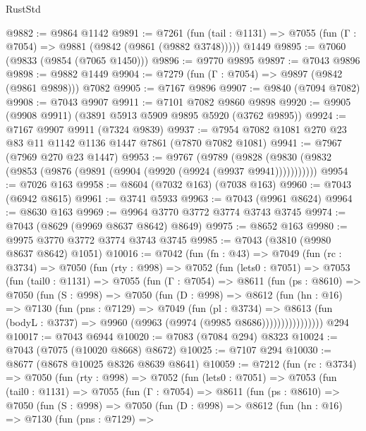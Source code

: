 \begin{lexlean}{RustStd}
\begin{coremodule}
@9882 := @9864 @1142
@9891 := @7261
    (fun (tail : @1131) => @7055 (fun (Γ : @7054) => @9881 (@9842 (@9861 (@9882 @3748)))))
    @1449
@9895 := @7060 (@9833 (@9854 (@7065 @1450)))
@9896 := @9770 @9895
@9897 := @7043 @9896
@9898 := @9882 @1449
@9904 := @7279 (fun (Γ : @7054) => @9897 (@9842 (@9861 @9898))) @7082
@9905 := @7167 @9896
@9907 := @9840 (@7094 @7082)
@9908 := @7043 @9907
@9911 := @7101 @7082 @9860 @9898
@9920 := @9905 (@9908 @9911) (@3891 @5913 @5909 @9895 @5920 (@3762 @9895))
@9924 := @7167 @9907 @9911 (@7324 @9839)
@9937 := @7954 @7082 @1081 @270 @23 @83 @11 @1142 @1136 @1447 @7861 (@7870 @7082 @1081)
@9941 := @7967 (@7969 @270 @23 @1447)
@9953 := @9767
    (@9789 (@9828 (@9830 (@9832 (@9853 (@9876 (@9891 (@9904 (@9920 (@9924 (@9937 @9941)))))))))))
@9954 := @7026 @163
@9958 := @8604 (@7032 @163) (@7038 @163)
@9960 := @7043 (@6942 @8615)
@9961 := @3741 @5933
@9963 := @7043 (@9961 @8624)
@9964 := @8630 @163
@9969 := @9964 @3770 @3772 @3774 @3743 @3745
@9974 := @7043 (@8629 (@9969 @8637 @8642) @8649)
@9975 := @8652 @163
@9980 := @9975 @3770 @3772 @3774 @3743 @3745
@9985 := @7043 (@3810 (@9980 @8637 @8642) @1051)
@10016 := @7042
    (fun (fn : @43) =>
    @7049
      (fun (rc : @3734) =>
      @7050
        (fun (rty : @998) =>
        @7052
          (fun (lets0 : @7051) =>
          @7053
            (fun (tail0 : @1131) =>
            @7055
              (fun (Γ : @7054) =>
              @8611
                (fun (ps : @8610) =>
                @7050
                  (fun (S : @998) =>
                  @7050
                    (fun (D : @998) =>
                    @8612
                      (fun (hn : @16) =>
                      @7130
                        (fun (pns : @7129) =>
                        @7049
                          (fun (pl : @3734) =>
                          @8613
                            (fun (bodyL : @3737) => @9960 (@9963 (@9974 (@9985 @8686))))))))))))))))
    @294
@10017 := @7043 @6944
@10020 := @7083 (@7084 @294) @8323
@10024 := @7043 (@7075 (@10020 @8668) @8672)
@10025 := @7107 @294
@10030 := @8677 (@8678 @10025 @8326 @8639 @8641)
@10059 := @7212
    (fun (rc : @3734) =>
    @7050
      (fun (rty : @998) =>
      @7052
        (fun (lets0 : @7051) =>
        @7053
          (fun (tail0 : @1131) =>
          @7055
            (fun (Γ : @7054) =>
            @8611
              (fun (ps : @8610) =>
              @7050
                (fun (S : @998) =>
                @7050
                  (fun (D : @998) =>
                  @8612
                    (fun (hn : @16) =>
                    @7130
                      (fun (pns : @7129) =>

\end{coremodule}
\end{lexlean}
